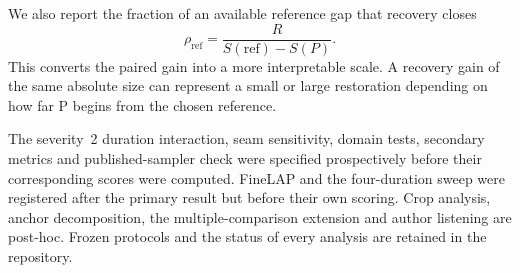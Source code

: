 We also report the fraction of an available reference gap that recovery closes
\begin{equation}
\rho_{\mathrm{ref}}=\frac{R}{S(\mathrm{ref})-S(P)}.
\end{equation}
This converts the paired gain into a more interpretable scale. A recovery gain of the same absolute size can represent a small or large restoration depending on how far P begins from the chosen reference.

The severity~2 duration interaction, seam sensitivity, domain tests, secondary metrics and published-sampler check were specified prospectively before their corresponding scores were computed. FineLAP and the four-duration sweep were registered after the primary result but before their own scoring. Crop analysis, anchor decomposition, the multiple-comparison extension and author listening are post-hoc. Frozen protocols and the status of every analysis are retained in the repository.

